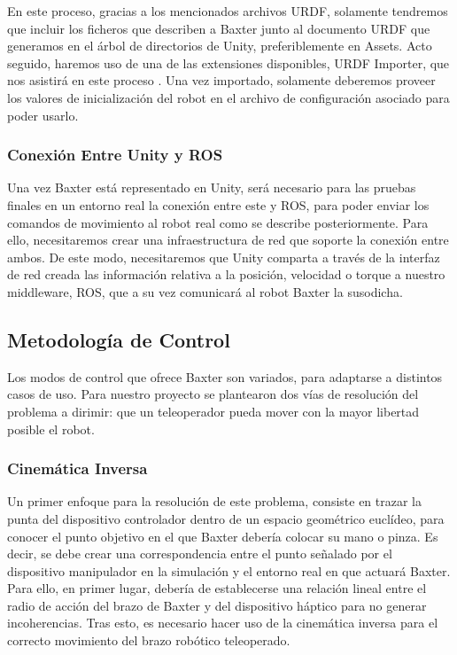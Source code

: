 En este proceso, gracias a los mencionados archivos URDF, solamente tendremos que incluir los ficheros que describen a Baxter junto al documento URDF que generamos en el árbol de directorios de Unity, preferiblemente en Assets. Acto seguido, haremos uso de una de las extensiones disponibles, URDF Importer, que nos asistirá en este proceso \cite{68}. Una vez importado, solamente deberemos proveer los valores de inicialización del robot en el archivo de configuración asociado para poder usarlo.

\subsubsection{Conexión Entre Unity y ROS}
Una vez Baxter está representado en Unity, será necesario para las pruebas finales en un entorno real la conexión entre este y ROS, para poder enviar los comandos de movimiento al robot real como se describe posteriormente. Para ello, necesitaremos crear una infraestructura de red que soporte la conexión entre ambos. De este modo, necesitaremos que Unity comparta a través de la interfaz de red creada las información relativa  a la posición, velocidad o torque a nuestro middleware, ROS, que a su vez comunicará al robot Baxter la susodicha.


\subsection{Metodología de Control}
Los modos de control que ofrece Baxter son variados, para adaptarse a distintos casos de uso. Para nuestro proyecto se plantearon dos vías de resolución del problema a dirimir: que un teleoperador pueda mover con la mayor libertad posible el robot.


\subsubsection{Cinemática Inversa}
Un primer enfoque para la resolución de este problema, consiste en trazar la punta del dispositivo controlador dentro de un espacio geométrico euclídeo, para conocer el punto objetivo en el que Baxter debería colocar su mano o pinza. Es decir, se debe crear una correspondencia entre el punto señalado por el dispositivo manipulador en la simulación y el entorno real en que actuará Baxter. Para ello, en primer lugar, debería de establecerse una relación lineal entre el radio de acción del brazo de Baxter y del dispositivo háptico para no generar incoherencias. Tras esto, es necesario hacer uso de la cinemática inversa para el correcto movimiento del brazo robótico teleoperado.

